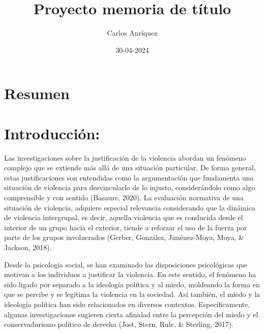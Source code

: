 \documentclass[12pt,twoside]{templates/facsothesis}
\title{Proyecto memoria de título}
\author{Carlos Anríquez}
\date{30-04-2024}
\begin{document}

  \maketitle

\frontmatter %
\pagestyle{empty} %



  \setcounter{tocdepth}{1}
  \setlength{\parskip}{0pt}
  \tableofcontents

\setlength\parskip{1em plus 0.1em minus 0.2em}

  \listoftables

  \listoffigures



\mainmatter %
\pagestyle{fancyplain} %

\hypertarget{resumen}{%
\chapter*{Resumen}\label{resumen}}

\hypertarget{introducciuxf3n}{%
\chapter{Introducción:}\label{introducciuxf3n}}

Las investigaciones sobre la justificación de la violencia abordan un fenómeno complejo que se extiende más allá de una situación particular. De forma general, estas justificaciones son entendidas como la argumentación que fundamenta una situación de violencia para desvincularlo de lo injusto, considerándolo como algo comprensible y con sentido (Basaure, 2020). La evaluación normativa de una situación de violencia, adquiere especial relevancia considerando que la dinámica de violencia intergrupal, es decir, aquella violencia que es conducida desde el interior de un grupo hacia el exterior, tiende a reforzar el uso de la fuerza por parte de los grupos involucrados (Gerber, González, Jiménez-Moya, Moya, \& Jackson, 2018).

Desde la psicología social, se han examinado las disposiciones psicológicas que motivan a los individuos a justificar la violencia. En este sentido, el fenómeno ha sido ligado por separado a la ideología política y al miedo, moldeando la forma en que se percibe y se legitima la violencia en la sociedad. Así también, el miedo y la ideología política han sido relacionados en diversos contextos. Específicamente, algunas investigaciones sugieren cierta afinidad entre la percepción del miedo y el conservadurismo político de derecha (Jost, Stern, Rule, \& Sterling, 2017).
\end{document}
